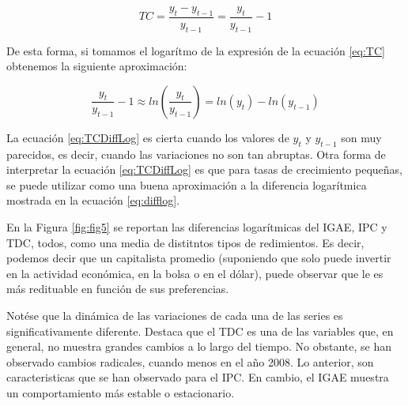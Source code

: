 \documentclass[
]{book}
\begin{document}
\begin{equation}
    TC = \frac{y_t - y_{t-1}}{y_{t-1}} = \frac{y_t}{y_{t-1}} - 1
    \label{eq:TC}
\end{equation}

De esta forma, si tomamos el logarítmo de la expresión de la ecuación \eqref{eq:TC} obtenemos la siguiente aproximación:

\begin{equation}
    \frac{y_t}{y_{t-1}} -1  \approx ln \left( \frac{y_t}{y_{t-1}} \right) = ln(y_t) - ln(y_{t-1})
    \label{eq:TCDiffLog}
\end{equation}

La ecuación \eqref{eq:TCDiffLog} es cierta cuando los valores de \(y_t\) y \(y_{t-1}\) son muy parecidos, es decir, cuando las variaciones no son tan abruptas. Otra forma de interpretar la ecuación \eqref{eq:TCDiffLog} es que para tasas de crecimiento pequeñas, se puede utilizar como una buena aproximación a la diferencia logarítmica mostrada en la ecuación \eqref{eq:difflog}.

En la Figura \ref{fig:fig5} se reportan las diferencias logarítmicas del IGAE, IPC y TDC, todos, como una media de distitntos tipos de redimientos. Es decir, podemos decir que un capitalista promedio (suponiendo que solo puede invertir en la actividad económica, en la bolsa o en el dólar), puede observar que le es más redituable en función de sus preferencias.

Notése que la dinámica de las variaciones de cada una de las series es significativamente diferente. Destaca que el TDC es una de las variables que, en general, no muestra grandes cambios a lo largo del tiempo. No obstante, se han observado cambios radicales, cuando menos en el año 2008. Lo anterior, son caracteristicas que se han observado para el IPC. En cambio, el IGAE muestra un comportamiento más estable o estacionario.

  
\end{document}
